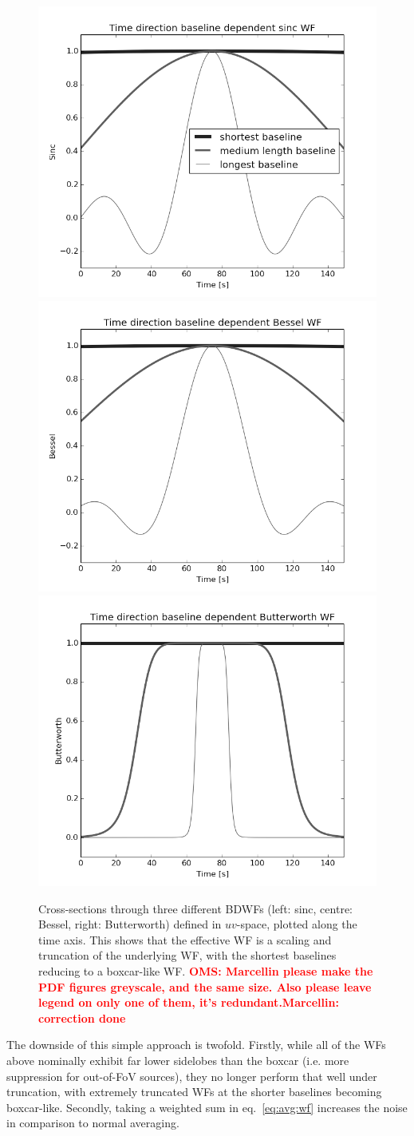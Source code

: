 \documentclass[useAMS,usenatbib]{mn2e}
\newcommand{\OMS}[1]{\textcolor{red}{{\bf OMS: #1}}}
\begin{document}
\begin{figure}%
\includegraphics[width=.33\textwidth]{./Figures/sinc-baseline_longMidShortshortgrey.png}\hfill%
\includegraphics[width=.33\textwidth]{./Figures/bessel-baseline_longMidShortshortgrey.png}\hfill%
\includegraphics[width=.33\textwidth]{./Figures/butterworth-baseline_longMidShortshortgrey.png}
\caption{Cross-sections through three different BDWFs (left: sinc, centre: Bessel, right: Butterworth) defined in $uv$-space, 
plotted along the time axis. This shows that the effective WF is a scaling and truncation of the underlying WF, with
the shortest baselines reducing to a boxcar-like WF. \OMS{Marcellin please make the PDF figures greyscale, and the same size.
Also please leave legend on only one of them, it's redundant.Marcellin: correction done}}
\label{fig:WF:perbaseline}
\end{figure}

The downside of this simple approach is twofold. Firstly, while all of the WFs above nominally exhibit far lower 
sidelobes than the boxcar
(i.e. more suppression for out-of-FoV sources), they no longer perform that well under truncation, with extremely truncated WFs 
at the shorter baselines becoming boxcar-like. Secondly, taking a weighted sum in eq.~\ref{eq:avg:wf} increases 
the noise in comparison to normal averaging.
\end{document}
